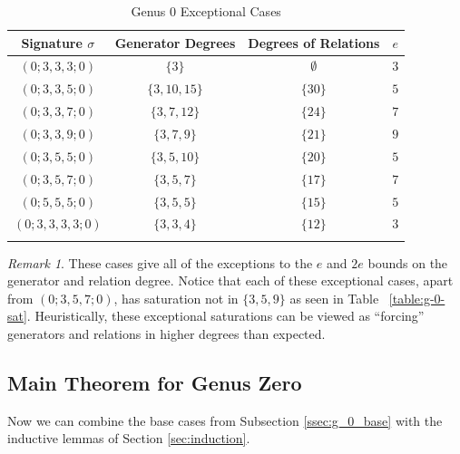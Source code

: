 \documentclass{amsart}
\theoremstyle{plain}
\theoremstyle{definition}
\theoremstyle{remark}
\newtheorem{rem}[thm]{Remark}
\numberwithin{equation}{section}
\newcommand\ssec{\subsection}
\begin{document}
\begin{longtable}
	{| c || c | c | c |}
	\hline
	Signature $\sigma$ & Generator Degrees & Degrees of Relations & $e$ \\
	\hline
	\hline

	$(0; 3, 3, 3; 0)$ & $\{3\}$ & $\emptyset$ & $3$ \\	\hline

	$(0; 3, 3, 5; 0)$ & $\{3, 10, 15\}$ & $\{30\}$ & $5$ \\	\hline
	
	$(0; 3, 3, 7; 0)$ & $\{3, 7, 12\}$ & $\{24\}$ & $7$ \\	\hline
	
	$(0; 3, 3, 9; 0)$ & $\{3, 7, 9\}$ & $\{21\}$ & $9$ \\	\hline
	
	$(0; 3, 5, 5; 0)$ & $\{3, 5, 10\}$ & $\{20\}$ & $5$ \\	\hline
	
	$(0; 3, 5, 7; 0)$ & $\{3, 5, 7\}$ & $\{17\}$ & $7$ \\	\hline
	
	$(0; 5, 5, 5; 0)$ & $\{3, 5, 5\}$ & $\{15\}$ & $5$ \\	\hline
	
	$(0; 3, 3, 3, 3; 0)$ & $\{3, 3, 4\}$ & $\{12\}$ & $3$ \\	\hline
	
	\caption{Genus 0 Exceptional Cases}
	\label{table:g-0-exceptional}
\end{longtable}

\begin{rem}
These cases give all of the exceptions to the $e$ and $2e$ bounds on
the generator and relation degree. Notice that each of these
exceptional cases, apart from $(0; 3, 5, 7; 0)$, has saturation not in $\{3, 5, 9\}$ as seen in Table ~\ref{table:g-0-sat}.
Heuristically, 
these exceptional saturations can be viewed as ``forcing'' generators and relations in higher degrees than expected.
\end{rem}

\ssec{Main Theorem for Genus Zero}
\label{ssec:g-0-main}
Now we can combine the base cases from Subsection \ref{ssec:g_0_base} with the inductive lemmas of Section \ref{sec:induction}.
\end{document}
